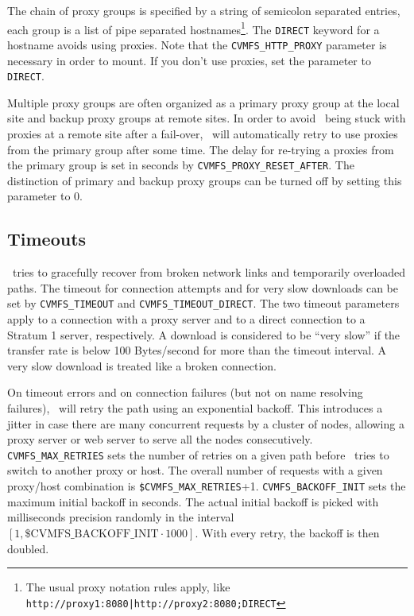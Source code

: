 The chain of proxy groups is specified by a string of semicolon separated entries, each group is a list of pipe separated hostnames\footnote{The usual proxy notation rules apply, like \texttt{http://proxy1:8080|http://proxy2:8080;DIRECT}}.
The \texttt{DIRECT} keyword for a hostname avoids using proxies.
Note that the \texttt{CVMFS\_HTTP\_PROXY} parameter is necessary in order to mount.
If you don't use proxies, set the parameter to \texttt{DIRECT}.

Multiple proxy groups are often organized as a primary proxy group at the local site and backup proxy groups at remote sites.
In order to avoid \cvmfs\ being stuck with proxies at a remote site after a fail-over, \cvmfs\ will automatically retry to use proxies from the primary group after some time.
The delay for re-trying a proxies from the primary group is set in seconds by \texttt{CVMFS\_PROXY\_RESET\_AFTER}.
The distinction of primary and backup proxy groups can be turned off by setting this parameter to 0.

\subsection{Timeouts}
\cvmfs\ tries to gracefully recover from broken network links and temporarily overloaded paths.
The timeout for connection attempts and for very slow downloads can be set by \texttt{CVMFS\_TIMEOUT} and \texttt{CVMFS\_TIMEOUT\_DIRECT}.
The two timeout parameters apply to a connection with a proxy server and to a direct connection to a Stratum 1 server, respectively.
A download is considered to be ``very slow'' if the transfer rate is below 100 Bytes/second for more than the timeout interval.
A very slow download is treated like a broken connection.

On timeout errors and on connection failures (but not on name resolving failures), \cvmfs\ will retry the path using an exponential backoff.
This introduces a jitter in case there are many concurrent requests by a cluster of nodes, allowing a proxy server or web server to serve all the nodes consecutively.
\texttt{CVMFS\_MAX\_RETRIES} sets the number of retries on a given path before \cvmfs\ tries to switch to another proxy or host. 
The overall number of requests with a given proxy/host combination is \texttt{\$CVMFS\_MAX\_RETRIES}+1.
\texttt{CVMFS\_BACKOFF\_INIT} sets the maximum initial backoff in seconds.  
The actual initial backoff is picked with milliseconds precision randomly in the interval $[1, \text{\$CVMFS\_BACKOFF\_INIT}\cdot 1000]$.
With every retry, the backoff is then doubled.

